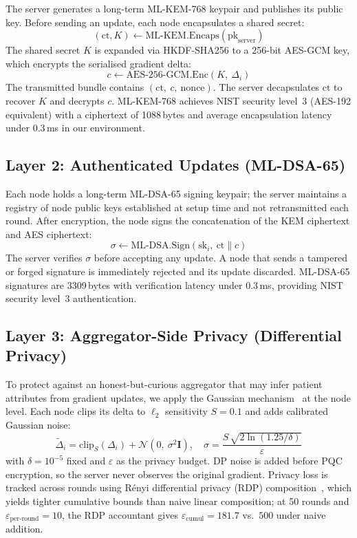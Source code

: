 \documentclass[conference]{IEEEtran}
\begin{document}
The server generates a long-term ML-KEM-768 keypair and publishes its
public key.
Before sending an update, each node encapsulates a shared secret:
\begin{equation}
  (\text{ct}, K) \leftarrow \text{ML-KEM.Encaps}(\text{pk}_{\text{server}})
\end{equation}
The shared secret $K$ is expanded via HKDF-SHA256 to a 256-bit
AES-GCM key, which encrypts the serialised gradient delta:
\begin{equation}
  c \leftarrow \text{AES-256-GCM.Enc}(K,\ \Delta_i)
\end{equation}
The transmitted bundle contains $(\text{ct},\ c,\ \text{nonce})$.
The server decapsulates $\text{ct}$ to recover $K$ and decrypts $c$.
ML-KEM-768 achieves NIST security level~3 (AES-192 equivalent) with a
ciphertext of 1088\,bytes and average encapsulation latency under
0.3\,ms in our environment.

\subsection{Layer 2: Authenticated Updates (ML-DSA-65)}

Each node holds a long-term ML-DSA-65 signing keypair; the server
maintains a registry of node public keys established at setup time
and not retransmitted each round.
After encryption, the node signs the concatenation of the KEM
ciphertext and AES ciphertext:
\begin{equation}
  \sigma \leftarrow \text{ML-DSA.Sign}(\text{sk}_i,\ \text{ct} \| c)
\end{equation}
The server verifies $\sigma$ before accepting any update.
A node that sends a tampered or forged signature is immediately
rejected and its update discarded.
ML-DSA-65 signatures are 3309\,bytes with verification latency under
0.3\,ms, providing NIST security level~3 authentication.

\subsection{Layer 3: Aggregator-Side Privacy (Differential Privacy)}

To protect against an honest-but-curious aggregator that may infer
patient attributes from gradient updates, we apply the Gaussian
mechanism~\cite{dwork2006} at the node level.
Each node clips its delta to $\ell_2$ sensitivity $S = 0.1$ and adds
calibrated Gaussian noise:
\begin{equation}
  \tilde{\Delta}_i = \text{clip}_{S}(\Delta_i)
    + \mathcal{N}(0,\ \sigma^2 \mathbf{I}), \quad
  \sigma = \frac{S\,\sqrt{2\ln(1.25/\delta)}}{\varepsilon}
\end{equation}
with $\delta = 10^{-5}$ fixed and $\varepsilon$ as the privacy budget.
DP noise is added before PQC encryption, so the server never observes
the original gradient.
Privacy loss is tracked across rounds using R\'{e}nyi differential
privacy (RDP) composition~\cite{mironov2017rdp}, which yields tighter
cumulative bounds than naive linear composition; at 50 rounds and
$\varepsilon_{\text{per-round}}=10$, the RDP accountant gives
$\varepsilon_{\text{cumul}}=181.7$ vs.\ $500$ under naive addition.
\end{document}
